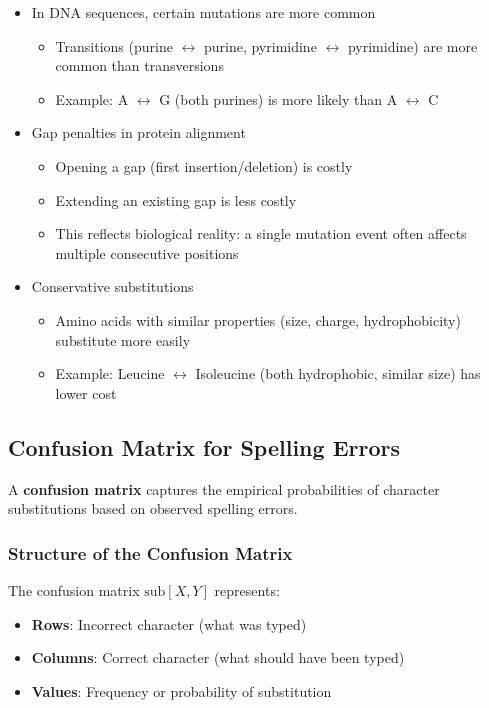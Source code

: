 \documentclass[11pt,a4paper]{article}
\theoremstyle{definition}
\theoremstyle{plain}
\theoremstyle{remark}
\begin{document}
\begin{itemize}
    \item In DNA sequences, certain mutations are more common
    \begin{itemize}
        \item Transitions (purine $\leftrightarrow$ purine, pyrimidine $\leftrightarrow$ pyrimidine) are more common than transversions
        \item Example: A $\leftrightarrow$ G (both purines) is more likely than A $\leftrightarrow$ C
    \end{itemize}
    
    \item Gap penalties in protein alignment
    \begin{itemize}
        \item Opening a gap (first insertion/deletion) is costly
        \item Extending an existing gap is less costly
        \item This reflects biological reality: a single mutation event often affects multiple consecutive positions
    \end{itemize}
    
    \item Conservative substitutions
    \begin{itemize}
        \item Amino acids with similar properties (size, charge, hydrophobicity) substitute more easily
        \item Example: Leucine $\leftrightarrow$ Isoleucine (both hydrophobic, similar size) has lower cost
    \end{itemize}
\end{itemize}

\subsection{Confusion Matrix for Spelling Errors}

A \textbf{confusion matrix} captures the empirical probabilities of character substitutions based on observed spelling errors.

\subsubsection{Structure of the Confusion Matrix}

The confusion matrix $\text{sub}[X, Y]$ represents:
\begin{itemize}
    \item \textbf{Rows}: Incorrect character (what was typed)
    \item \textbf{Columns}: Correct character (what should have been typed)
    \item \textbf{Values}: Frequency or probability of substitution
\end{itemize}
\end{document}
